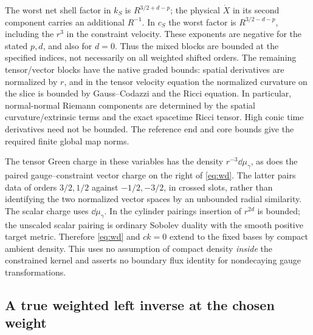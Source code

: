 The worst net shell factor in \(k_S\) is \(R^{3/2+d-p}\); the physical \(\dot X\) in its second component carries an additional \(R^{-1}\). In \(c_S\) the worst factor is \(R^{3/2-d-p}\), including the \(r^3\) in the constraint velocity. These exponents are negative for the stated \(p,d\), and also for \(d=0\). Thus the mixed blocks are bounded at the specified indices, not necessarily on all weighted shifted orders. The remaining tensor/vector blocks have the native graded bounds: spatial derivatives are normalized by \(r\), and in the tensor velocity equation the normalized curvature on the slice is bounded by Gauss--Codazzi and the Ricci equation. In particular, normal-normal Riemann components are determined by the spatial curvature/extrinsic terms and the exact spacetime Ricci tensor. High conic time derivatives need not be bounded. The reference end and core bounds give the required finite global map norms.

The tensor Green charge in these variables has the density \(r^{-3}\dd\mu_\gamma\), as does the paired gauge--constraint vector charge on the right of \eqref{eq:wd}. The latter pairs data of orders \(3/2,1/2\) against \(-1/2,-3/2\), in crossed slots, rather than identifying the two normalized vector spaces by an unbounded radial similarity. The scalar charge uses \(\dd\mu_\gamma\). In the cylinder pairings insertion of \(r^{2d}\) is bounded; the unscaled scalar pairing is ordinary Sobolev duality with the smooth positive target metric. Therefore \eqref{eq:wd} and \(ck=0\) extend to the fixed bases by compact ambient density. This uses no assumption of compact density \emph{inside} the constrained kernel and asserts no boundary flux identity for nondecaying gauge transformations.

\subsection{A true weighted left inverse at the chosen weight}\label{sec:adm}

